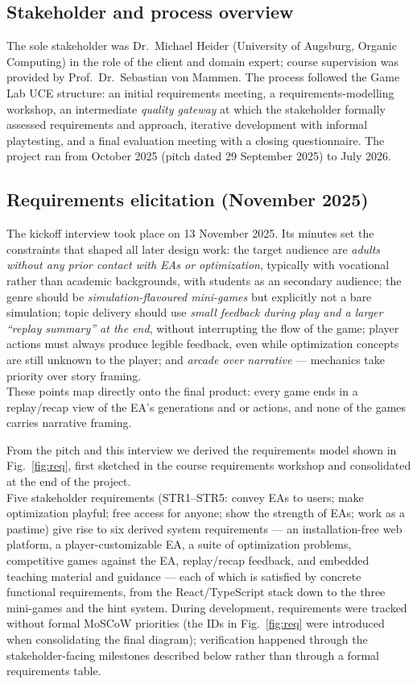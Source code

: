 \documentclass[conference]{IEEEtran}
\begin{document}
\subsection{Stakeholder and process overview}
The sole stakeholder was Dr.\ Michael Heider (University of Augsburg, Organic Computing) in the role of the client and domain expert; course supervision was provided by Prof.\ Dr.\ Sebastian von Mammen. The process followed the Game Lab UCE structure: an initial requirements meeting, a requirements-modelling workshop, an intermediate \emph{quality gateway} at which the stakeholder formally assessed requirements and approach, iterative development with informal playtesting, and a final evaluation meeting with a closing questionnaire. The project ran from October 2025 (pitch dated 29 September 2025) to July 2026.

\subsection{Requirements elicitation (November 2025)}
The kickoff interview took place on 13 November 2025. Its minutes set the constraints that shaped all later design work: the target audience are \emph{adults without any prior contact with EAs or optimization}, typically with vocational rather than academic backgrounds, with students as an secondary audience; the genre should be \emph{simulation-flavoured mini-games} but explicitly not a bare simulation; topic delivery should use \emph{small feedback during play and a larger ``replay summary'' at the end}, without interrupting the flow of the game; player actions must always produce legible feedback, even while optimization concepts are still unknown to the player; and \emph{arcade over narrative} --- mechanics take priority over story framing.\\
These points map directly onto the final product: every game ends in a replay/recap view of the EA's generations and or actions, and none of the games carries narrative framing.

From the pitch and this interview we derived the requirements model shown in Fig.~\ref{fig:req}, first sketched in the course requirements workshop and consolidated at the end of the project. \\
Five stakeholder requirements (STR1--STR5: convey EAs to users; make optimization playful; free access for anyone; show the strength of EAs; work as a pastime) give rise to six derived system requirements --- an installation-free web platform, a player-customizable EA, a suite of optimization problems, competitive games against the EA, replay/recap feedback, and embedded teaching material and guidance --- each of which is satisfied by concrete functional requirements, from the React/TypeScript stack down to the three mini-games and the hint system. During development, requirements were tracked without formal MoSCoW priorities (the IDs in Fig.~\ref{fig:req} were introduced when consolidating the final diagram); verification happened through the stakeholder-facing milestones described below rather than through a formal requirements table.
\end{document}
